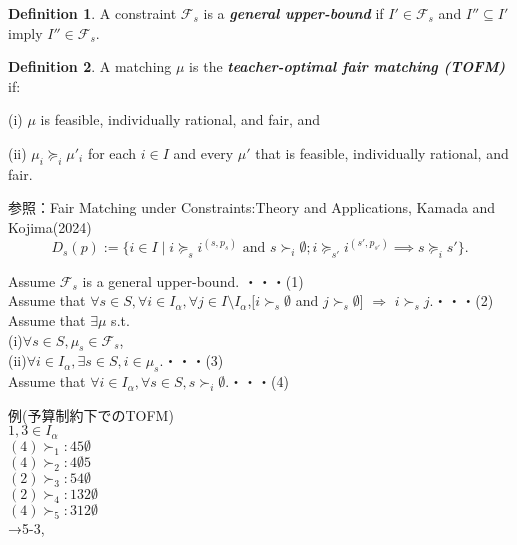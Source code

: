 \documentclass[a4j,10pt]{jsarticle}
\theoremstyle{definition}
\newtheorem{defn}{Definition}
\theoremstyle{remark}
\theoremstyle{plain}
\begin{document}
\begin{defn}
  A constraint $\mathcal{F}_s$ is a {\bf \emph{general upper-bound}} if $I' \in \mathcal{F}_s$ and $I'' \subseteq I'$ imply $I'' \in \mathcal{F}_s$.
\end{defn}

\begin{defn}
  A matching $\mu$ is the {\bf \emph{teacher-optimal fair matching (TOFM)}} if:
  
  (i) $\mu$ is feasible, individually rational, and fair, and
  
  (ii) $\mu_i \succeq_i \mu'_i$ for each $i \in I$ and every $\mu'$ that is feasible, individually rational, and fair.
\end{defn}


参照：Fair Matching under Constraints:Theory and Applications, Kamada and Kojima(2024)
\[
  D_s(p) := \{i \in I \mid i \succeq_s i^{(s,p_s)} \text{ and } s \succ_i \emptyset; i \succeq_{s'} i^{(s',p_{s'})} \implies s \succeq_i s' \}.
\]

\begin{tcolorbox}
  Assume  $\mathcal{F}_s$ is a general upper-bound. ・・・(1)\\
  Assume that $\forall s \in S,\forall i \in I_\alpha,\forall j \in I\setminus I_\alpha$,[$i \succ_s \emptyset$ and $j\succ_s \emptyset$] $\Longrightarrow $ $i \succ_s j$.・・・(2)\\
  Assume that $\exists \mu $ s.t. \\
    (i)$\forall s \in S , \mu_s \in \mathcal{F}_s$,\\
    (ii)$\forall i \in I_\alpha,\exists s \in S, i \in \mu_s$.・・・(3)\\
  Assume that $\forall i \in I_\alpha, \forall s \in S, s \succ_i \emptyset$.・・・(4)
\end{tcolorbox}

例(予算制約下でのTOFM)\\

$1,3 \in I_\alpha$\\
$(4)\succ_1:45\emptyset$ \\  
$(4)\succ_2:4\emptyset 5$ \\
$(2)\succ_3:54\emptyset$ \\
$(2)\succ_4:132\emptyset$ \\  
$(4)\succ_5:312\emptyset$ \\
→5-3,



\end{document}
